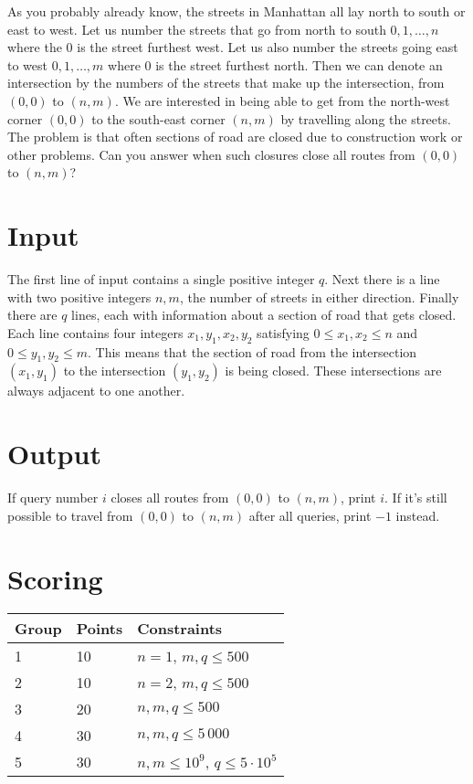 
As you probably already know, the streets in Manhattan all lay north to south or east to west. Let us number the streets that go from north
to south $0, 1, \dots, n$ where the $0$ is the street furthest west. Let us also number the streets going east to west $0, 1, \dots, m$
where $0$ is the street furthest north. Then we can denote an intersection by the numbers of the streets that make up the intersection,
from $(0, 0)$ to $(n, m)$. We are interested in being able to get from the north-west corner $(0, 0)$ to the south-east corner $(n, m)$ by
travelling along the streets.
The problem is that often sections of road are closed due to construction work or other problems. Can you answer when such closures close
all routes from $(0, 0)$ to $(n, m)$?

\section*{Input}
The first line of input contains a single positive integer $q$. Next there is a line with two positive integers $n, m$, the number of streets
in either direction. Finally there are $q$ lines, each with information about a section of road that gets closed. Each line contains four
integers $x_1, y_1, x_2, y_2$ satisfying $0 \leq x_1, x_2 \leq n$ and $0 \leq y_1, y_2 \leq m$. This means that the section of road from
the intersection $(x_1, y_1)$ to the intersection $(y_1, y_2)$ is being closed. These intersections are always adjacent to one another.

\section*{Output}
If query number $i$ closes all routes from $(0, 0)$ to $(n, m)$, print $i$. If it's still possible to travel from $(0, 0)$ to $(n, m)$ after
all queries, print $-1$ instead.

\section*{Scoring}
\begin{tabular}{|l|l|l|}
\hline
Group & Points & Constraints \\ \hline
1     & 10   & $n = 1$, $m, q \leq 500$ \\ \hline
2     & 10   & $n = 2$, $m, q \leq 500$ \\ \hline
3     & 20   & $n, m, q \leq 500$ \\ \hline
4     & 30   & $n, m, q \leq 5\,000$ \\ \hline
5     & 30   & $n, m \leq 10^9$, $q \leq 5 \cdot 10^5$ \\ \hline
\end{tabular}

